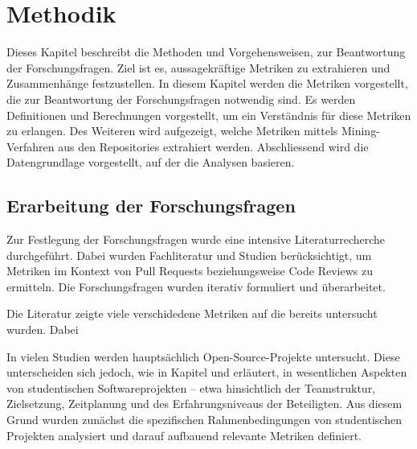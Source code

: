


\chapter{Methodik} %

\label{Chapter3} %

Dieses Kapitel beschreibt die Methoden und Vorgehensweisen, zur Beantwortung der Forschungsfragen. Ziel ist es, aussagekräftige Metriken zu extrahieren und Zusammenhänge festzustellen. 
In diesem Kapitel werden die Metriken vorgestellt, die zur Beantwortung der Forschungsfragen notwendig sind. Es werden Definitionen und Berechnungen vorgestellt, um ein Verständnis für diese Metriken zu erlangen. Des Weiteren wird aufgezeigt, welche Metriken mittels Mining-Verfahren aus den Repositories extrahiert werden. Abschliessend wird die Datengrundlage vorgestellt, auf der die Analysen basieren.

\section{Erarbeitung der Forschungsfragen}
\label{sec:ErarbeitungFF}
Zur Festlegung der Forschungsfragen wurde eine intensive Literaturrecherche durchgeführt. Dabei wurden Fachliteratur und Studien berücksichtigt, um Metriken im Kontext von Pull Requests beziehungsweise Code Reviews zu ermitteln. Die Forschungsfragen wurden iterativ formuliert und überarbeitet.

Die Literatur zeigte viele verschidedene Metriken auf die bereits untersucht wurden. Dabei 

In vielen Studien werden hauptsächlich Open-Source-Projekte untersucht. Diese unterscheiden sich jedoch, wie in Kapitel  und  erläutert, in wesentlichen Aspekten von studentischen Softwareprojekten – etwa hinsichtlich der Teamstruktur, Zielsetzung, Zeitplanung und des Erfahrungsniveaus der Beteiligten. Aus diesem Grund wurden zunächst die spezifischen Rahmenbedingungen von studentischen Projekten analysiert und darauf aufbauend relevante Metriken definiert.

